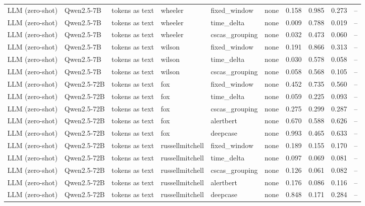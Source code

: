 \begin{longtable}{llllllcccc}
\addlinespace
LLM (zero-shot) & Qwen2.5-7B & tokens as text & wheeler & fixed\_window & none & 0.158 & 0.985 & 0.273 & -- \\
\addlinespace
LLM (zero-shot) & Qwen2.5-7B & tokens as text & wheeler & time\_delta & none & 0.009 & 0.788 & 0.019 & -- \\
\addlinespace
LLM (zero-shot) & Qwen2.5-7B & tokens as text & wheeler & cscas\_grouping & none & 0.032 & 0.473 & 0.060 & -- \\
\addlinespace
LLM (zero-shot) & Qwen2.5-7B & tokens as text & wilson & fixed\_window & none & 0.191 & 0.866 & 0.313 & -- \\
\addlinespace
LLM (zero-shot) & Qwen2.5-7B & tokens as text & wilson & time\_delta & none & 0.030 & 0.578 & 0.058 & -- \\
\addlinespace
LLM (zero-shot) & Qwen2.5-7B & tokens as text & wilson & cscas\_grouping & none & 0.058 & 0.568 & 0.105 & -- \\
\addlinespace
LLM (zero-shot) & Qwen2.5-72B & tokens as text & fox & fixed\_window & none & 0.452 & 0.735 & 0.560 & -- \\
\addlinespace
LLM (zero-shot) & Qwen2.5-72B & tokens as text & fox & time\_delta & none & 0.059 & 0.225 & 0.093 & -- \\
\addlinespace
LLM (zero-shot) & Qwen2.5-72B & tokens as text & fox & cscas\_grouping & none & 0.275 & 0.299 & 0.287 & -- \\
\addlinespace
LLM (zero-shot) & Qwen2.5-72B & tokens as text & fox & alertbert & none & 0.670 & 0.588 & 0.626 & -- \\
\addlinespace
LLM (zero-shot) & Qwen2.5-72B & tokens as text & fox & deepcase & none & 0.993 & 0.465 & 0.633 & -- \\
\addlinespace
LLM (zero-shot) & Qwen2.5-72B & tokens as text & russellmitchell & fixed\_window & none & 0.189 & 0.155 & 0.170 & -- \\
\addlinespace
LLM (zero-shot) & Qwen2.5-72B & tokens as text & russellmitchell & time\_delta & none & 0.097 & 0.069 & 0.081 & -- \\
\addlinespace
LLM (zero-shot) & Qwen2.5-72B & tokens as text & russellmitchell & cscas\_grouping & none & 0.126 & 0.061 & 0.082 & -- \\
\addlinespace
LLM (zero-shot) & Qwen2.5-72B & tokens as text & russellmitchell & alertbert & none & 0.176 & 0.086 & 0.116 & -- \\
\addlinespace
LLM (zero-shot) & Qwen2.5-72B & tokens as text & russellmitchell & deepcase & none & 0.848 & 0.171 & 0.284 & -- \\

\end{longtable}

